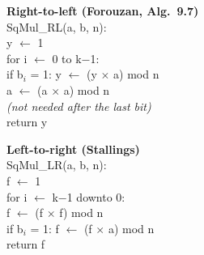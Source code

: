 \begin{center}
\begin{minipage}[t]{0.47\textwidth}
\small\textbf{Right-to-left (Forouzan, Alg.\ 9.7)}\\[2pt]
\ttfamily\footnotesize
SqMul\_RL(a, b, n):\\
\hspace*{1em}y $\leftarrow$ 1\\
\hspace*{1em}for i $\leftarrow$ 0 to k$-$1:\\
\hspace*{2em}if b$_i$ = 1: y $\leftarrow$ (y $\times$ a) mod n\\
\hspace*{2em}a $\leftarrow$ (a $\times$ a) mod n\\
\hspace*{2em}\textrm{\emph{(not needed after the last bit)}}\\
\hspace*{1em}return y
\end{minipage}\hfill
\begin{minipage}[t]{0.47\textwidth}
\small\textbf{Left-to-right (Stallings)}\\[2pt]
\ttfamily\footnotesize
SqMul\_LR(a, b, n):\\
\hspace*{1em}f $\leftarrow$ 1\\
\hspace*{1em}for i $\leftarrow$ k$-$1 downto 0:\\
\hspace*{2em}f $\leftarrow$ (f $\times$ f) mod n\\
\hspace*{2em}if b$_i$ = 1: f $\leftarrow$ (f $\times$ a) mod n\\
\hspace*{1em}return f
\end{minipage}
\end{center}

